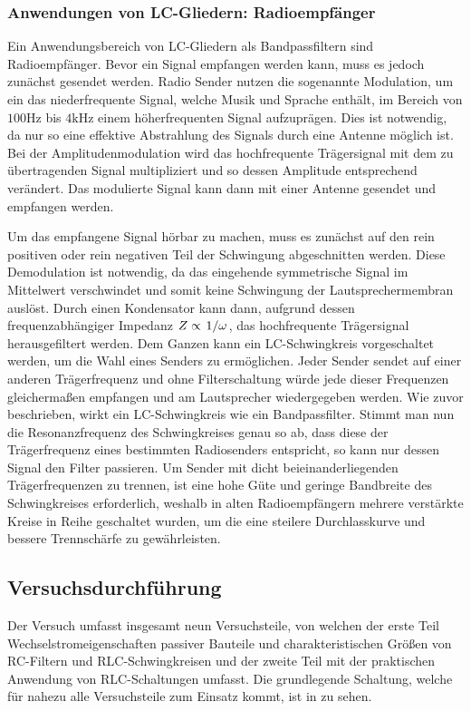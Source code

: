 \subsubsection*{Anwendungen von LC-Gliedern: Radioempfänger}

Ein Anwendungsbereich von LC-Gliedern als Bandpassfiltern sind Radioempfänger. Bevor ein Signal empfangen werden kann, muss es jedoch zunächst gesendet werden. Radio Sender nutzen die sogenannte Modulation, um ein das niederfrequente Signal, welche Musik und Sprache enthält, im Bereich von $100 \si{\hertz}$ bis $4 \si{\kilo\hertz}$ einem höherfrequenten Signal aufzuprägen. Dies ist notwendig, da nur so eine effektive Abstrahlung des Signals durch eine Antenne möglich ist. Bei der Amplitudenmodulation wird das hochfrequente Trägersignal mit dem zu übertragenden Signal multipliziert und so dessen Amplitude entsprechend verändert. Das modulierte Signal kann dann mit einer Antenne gesendet und empfangen werden. 

Um das empfangene Signal hörbar zu machen, muss es zunächst auf den rein positiven oder rein negativen Teil der Schwingung abgeschnitten werden. Diese Demodulation ist notwendig, da das eingehende symmetrische Signal im Mittelwert verschwindet und somit keine Schwingung der Lautsprechermembran auslöst. Durch einen Kondensator kann dann, aufgrund dessen frequenzabhängiger Impedanz $Z \propto \ffrac{1}{\omega}$, das hochfrequente Trägersignal herausgefiltert werden. Dem Ganzen kann ein LC-Schwingkreis vorgeschaltet werden, um die Wahl eines Senders zu ermöglichen. Jeder Sender sendet auf einer anderen Trägerfrequenz und ohne Filterschaltung würde jede dieser Frequenzen gleichermaßen empfangen und am Lautsprecher wiedergegeben werden. Wie zuvor beschrieben, wirkt ein LC-Schwingkreis wie ein Bandpassfilter. Stimmt man nun die Resonanzfrequenz des Schwingkreises genau so ab, dass diese der Trägerfrequenz eines bestimmten Radiosenders entspricht, so kann nur dessen Signal den Filter passieren. Um Sender mit dicht beieinanderliegenden Trägerfrequenzen zu trennen, ist eine hohe Güte und geringe Bandbreite des Schwingkreises erforderlich, weshalb in alten Radioempfängern mehrere verstärkte Kreise in Reihe geschaltet wurden, um die eine steilere Durchlasskurve und bessere Trennschärfe zu gewährleisten.
\newpage
\subsection{Versuchsdurchführung}

Der Versuch umfasst insgesamt neun Versuchsteile, von welchen der erste Teil Wechselstromeigenschaften passiver Bauteile und charakteristischen Größen von RC-Filtern und RLC-Schwingkreisen und der zweite Teil mit der praktischen Anwendung von RLC-Schaltungen umfasst. Die grundlegende Schaltung, welche für nahezu alle Versuchsteile zum Einsatz kommt, ist in  zu sehen.

